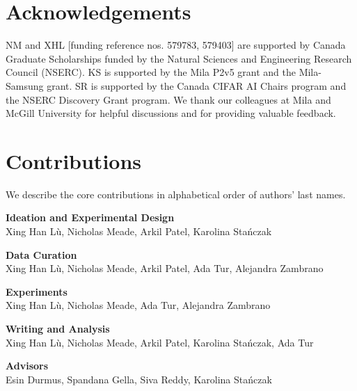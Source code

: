 \documentclass{article}
\theoremstyle{plain}
\theoremstyle{definition}
\theoremstyle{remark}
\begin{document}
\section*{Acknowledgements}
NM and XHL [funding reference nos. 579783, 579403] are supported by Canada Graduate Scholarships funded by
the Natural Sciences and Engineering Research Council (NSERC).
KS is supported by the Mila P2v5 grant and the Mila-Samsung grant.
SR is supported by the Canada CIFAR AI Chairs program and the NSERC Discovery Grant program.
We thank our colleagues at Mila and McGill University for helpful discussions and for providing valuable feedback.

\section*{Contributions}
We describe the core contributions in alphabetical order of authors' last names.

\textbf{Ideation and Experimental Design}\\
Xing Han Lù, Nicholas Meade, Arkil Patel, Karolina Stańczak

\textbf{Data Curation}\\
Xing Han Lù, Nicholas Meade, Arkil Patel, Ada Tur, Alejandra Zambrano

\textbf{Experiments}\\
Xing Han Lù, Nicholas Meade, Ada Tur, Alejandra Zambrano

\textbf{Writing and Analysis}\\
Xing Han Lù, Nicholas Meade, Arkil Patel, Karolina Stańczak, Ada Tur

\textbf{Advisors}\\
Esin Durmus, Spandana Gella, Siva Reddy, Karolina Stańczak




\newpage
\appendix

\end{document}
